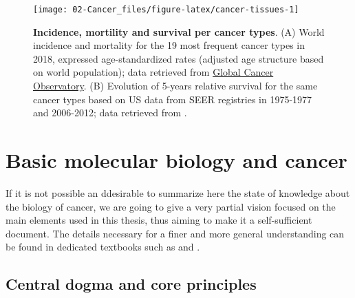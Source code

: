 \documentclass[a4paper,12pt,twoside,onecolumn,openright,final,oldfontcommands]{memoir}
\begin{document}
\begin{figure}

{\centering \texttt{[image: 02-Cancer\_files/figure-latex/cancer-tissues-1]} 

}

\caption[Incidence, mortility and survival per cancer types]{\textbf{Incidence, mortility and survival
per cancer types}. (A) World incidence and mortality for the 19 most
frequent cancer types in 2018, expressed age-standardized rates
(adjusted age structure based on world population); data retrieved from
\href{https://gco.iarc.fr/today/home}{Global Cancer Observatory}. (B)
Evolution of 5-years relative survival for the same cancer types based
on US data from SEER registries in 1975-1977 and 2006-2012; data
retrieved from \citet{jemal2017annual}.}\label{fig:cancer-tissues}
\end{figure}










\section{Basic molecular biology and cancer}\label{molecular-biology}

If it is not possible an ddesirable to summarize here the state of
knowledge about the biology of cancer, we are going to give a very
partial vision focused on the main elements used in this thesis, thus
aiming to make it a self-sufficient document. The details necessary for
a finer and more general understanding can be found in dedicated
textbooks such as \citet{alberts2007molecular} and
\citet{weinberg2013biology}.

\subsection{Central dogma and core
principles}\label{central-dogma-and-core-principles}
\end{document}
